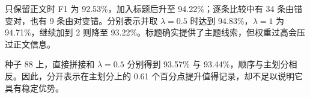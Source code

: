 只保留正文时 F1 为 92.53\%，加入标题后升至 94.22\%；逐条比较中有 34 条由错变对，也有 9 条由对变错。分别表示并取 $\lambda=0.5$ 时达到 94.83\%，$\lambda=1$ 为 94.71\%，继续加到 2 则降至 93.22\%。标题确实提供了主题线索，但权重过高会压过正文信息。

种子 88 上，直接拼接和 $\lambda=0.5$ 分别得到 93.57\% 与 93.44\%，顺序与主划分相反。因此，分开表示在主划分上的 0.61 个百分点提升值得记录，却不足以说明它具有稳定优势。
